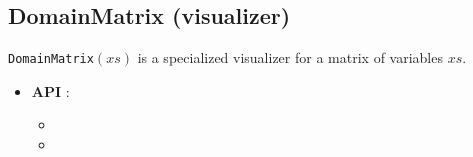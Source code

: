 \subsection{DomainMatrix (visualizer)}\label{domainmatrix:visu}\hypertarget{domainmatrix:visu}{}
\begin{notedef}
  \texttt{DomainMatrix}$(xs)$ is a specialized visualizer for a matrix of variables $xs$.
\end{notedef}

\begin{itemize}
	\item \textbf{API} : 
	\begin{itemize}
	\item {}
	\item {}
	\end{itemize}
\end{itemize}

%

